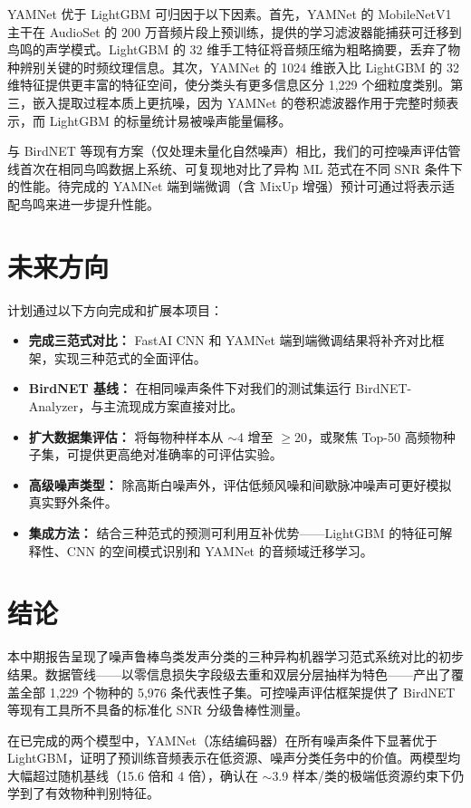 \documentclass[conference]{IEEEtran}
\begin{document}
YAMNet 优于 LightGBM 可归因于以下因素。首先，YAMNet 的 MobileNetV1 主干在 AudioSet 的 200 万音频片段上预训练，提供的学习滤波器能捕获可迁移到鸟鸣的声学模式。LightGBM 的 32 维手工特征将音频压缩为粗略摘要，丢弃了物种辨别关键的时频纹理信息。其次，YAMNet 的 1024 维嵌入比 LightGBM 的 32 维特征提供更丰富的特征空间，使分类头有更多信息区分 1,229 个细粒度类别。第三，嵌入提取过程本质上更抗噪，因为 YAMNet 的卷积滤波器作用于完整时频表示，而 LightGBM 的标量统计易被噪声能量偏移。

与 BirdNET 等现有方案（仅处理未量化自然噪声）相比，我们的可控噪声评估管线首次在相同鸟鸣数据上系统、可复现地对比了异构 ML 范式在不同 SNR 条件下的性能。待完成的 YAMNet 端到端微调（含 MixUp 增强）预计可通过将表示适配鸟鸣来进一步提升性能。

\section{未来方向}
计划通过以下方向完成和扩展本项目：
\begin{itemize}
\item \textbf{完成三范式对比：} FastAI CNN 和 YAMNet 端到端微调结果将补齐对比框架，实现三种范式的全面评估。
\item \textbf{BirdNET 基线：} 在相同噪声条件下对我们的测试集运行 BirdNET-Analyzer，与主流现成方案直接对比。
\item \textbf{扩大数据集评估：} 将每物种样本从 $\sim$4 增至 $\geq$20，或聚焦 Top-50 高频物种子集，可提供更高绝对准确率的可评估实验。
\item \textbf{高级噪声类型：} 除高斯白噪声外，评估低频风噪和间歇脉冲噪声可更好模拟真实野外条件。
\item \textbf{集成方法：} 结合三种范式的预测可利用互补优势——LightGBM 的特征可解释性、CNN 的空间模式识别和 YAMNet 的音频域迁移学习。
\end{itemize}

\section{结论}
本中期报告呈现了噪声鲁棒鸟类发声分类的三种异构机器学习范式系统对比的初步结果。数据管线——以零信息损失字段级去重和双层分层抽样为特色——产出了覆盖全部 1,229 个物种的 5,976 条代表性子集。可控噪声评估框架提供了 BirdNET 等现有工具所不具备的标准化 SNR 分级鲁棒性测量。

在已完成的两个模型中，YAMNet（冻结编码器）在所有噪声条件下显著优于 LightGBM，证明了预训练音频表示在低资源、噪声分类任务中的价值。两模型均大幅超过随机基线（15.6 倍和 4 倍），确认在 $\sim$3.9 样本/类的极端低资源约束下仍学到了有效物种判别特征。
\end{document}
